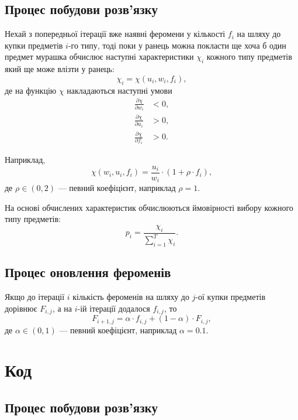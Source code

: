 \documentclass[a4paper, 12pt]{article}
\numberwithin{equation}{subsection}
\newcommand{\Sum}{\displaystyle\sum\limits}
\numberwithin{equation}{section}
\begin{document}
\subsection{Процес побудови розв'язку}

Нехай з попередньої ітерації вже наявні феромени у кількості $f_i$ на шляху до купки предметів $i$-го типу, тоді поки у ранець можна покласти ще хоча б один предмет мурашка обчислює наступні характеристики $\chi_i$ кожного типу предметів який ще може влізти у ранець:
\begin{equation}
	\chi_i = \chi(u_i, w_i, f_i),
\end{equation}
де на функцію $\chi$ накладаються наступні умови
\begin{align}
	\frac{\partial \chi}{\partial w_i} &< 0, \\
	\frac{\partial \chi}{\partial u_i} &> 0, \\
	\frac{\partial \chi}{\partial f_i} &> 0.
\end{align}

Наприклад,
\begin{equation}
	\chi(w_i, u_i, f_i) = \frac{u_i}{w_i} \cdot (1 + \rho \cdot f_i),
\end{equation}
де $\rho \in (0, 2)$ --- певний коефіцієнт, наприклад $\rho = 1$. \medskip

На основі обчислених характеристик обчислюються ймовірності вибору кожного типу предметів:
\begin{equation}
	p_i = \frac{\chi_i}{\Sum_{i = 1}^T \chi_i}.
\end{equation}

\subsection{Процес оновлення фероменів}

Якщо до ітерації $i$ кількість фероменів на шляху до $j$-ої купки предметів дорівнює $F_{i,j}$, а на $i$-ій ітерації додалося $f_{i,j}$, то
\begin{equation}
	F_{i+1,j} = \alpha \cdot f_{i, j} + (1 - \alpha) \cdot F_{i, j},
\end{equation}
де $\alpha \in (0, 1)$ --- певний коефіцієнт, наприклад $\alpha = 0.1$.

\section{Код}

\subsection{Процес побудови розв'язку}
\end{document}
